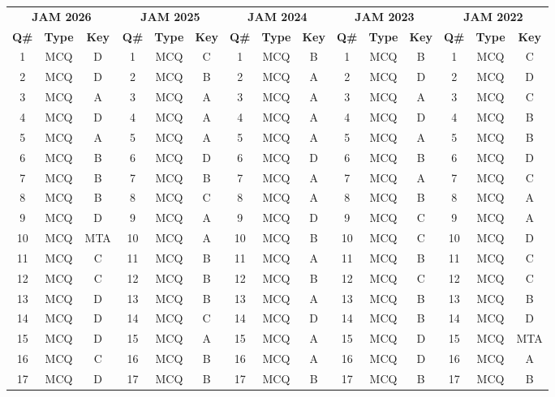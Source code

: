 \documentclass[11pt,a4paper]{article}
\begin{document}
\begin{center}
\footnotesize
\begin{tabularx}{\textwidth}{ccc|ccc|ccc|ccc|ccc}
\toprule
\multicolumn{3}{c|}{\textbf{JAM 2026}} & \multicolumn{3}{c|}{\textbf{JAM 2025}} & \multicolumn{3}{c|}{\textbf{JAM 2024}} & \multicolumn{3}{c|}{\textbf{JAM 2023}} & \multicolumn{3}{c}{\textbf{JAM 2022}} \\
\textbf{Q\#} & \textbf{Type} & \textbf{Key} & \textbf{Q\#} & \textbf{Type} & \textbf{Key} & \textbf{Q\#} & \textbf{Type} & \textbf{Key} & \textbf{Q\#} & \textbf{Type} & \textbf{Key} & \textbf{Q\#} & \textbf{Type} & \textbf{Key} \\
\midrule
1 & MCQ & D & 1 & MCQ & C & 1 & MCQ & B & 1 & MCQ & B & 1 & MCQ & C \\
2 & MCQ & D & 2 & MCQ & B & 2 & MCQ & A & 2 & MCQ & D & 2 & MCQ & D \\
3 & MCQ & A & 3 & MCQ & A & 3 & MCQ & A & 3 & MCQ & A & 3 & MCQ & C \\
4 & MCQ & D & 4 & MCQ & A & 4 & MCQ & A & 4 & MCQ & D & 4 & MCQ & B \\
5 & MCQ & A & 5 & MCQ & A & 5 & MCQ & A & 5 & MCQ & A & 5 & MCQ & B \\
6 & MCQ & B & 6 & MCQ & D & 6 & MCQ & D & 6 & MCQ & B & 6 & MCQ & D \\
7 & MCQ & B & 7 & MCQ & B & 7 & MCQ & A & 7 & MCQ & A & 7 & MCQ & C \\
8 & MCQ & B & 8 & MCQ & C & 8 & MCQ & A & 8 & MCQ & B & 8 & MCQ & A \\
9 & MCQ & D & 9 & MCQ & A & 9 & MCQ & D & 9 & MCQ & C & 9 & MCQ & A \\
10 & MCQ & MTA & 10 & MCQ & A & 10 & MCQ & B & 10 & MCQ & C & 10 & MCQ & D \\
11 & MCQ & C & 11 & MCQ & B & 11 & MCQ & A & 11 & MCQ & B & 11 & MCQ & C \\
12 & MCQ & C & 12 & MCQ & B & 12 & MCQ & B & 12 & MCQ & C & 12 & MCQ & C \\
13 & MCQ & D & 13 & MCQ & B & 13 & MCQ & A & 13 & MCQ & B & 13 & MCQ & B \\
14 & MCQ & D & 14 & MCQ & C & 14 & MCQ & D & 14 & MCQ & B & 14 & MCQ & D \\
15 & MCQ & D & 15 & MCQ & A & 15 & MCQ & A & 15 & MCQ & D & 15 & MCQ & MTA \\
16 & MCQ & C & 16 & MCQ & B & 16 & MCQ & A & 16 & MCQ & D & 16 & MCQ & A \\
17 & MCQ & D & 17 & MCQ & B & 17 & MCQ & B & 17 & MCQ & B & 17 & MCQ & B \\

\end{tabularx}
\end{center}
\end{document}
